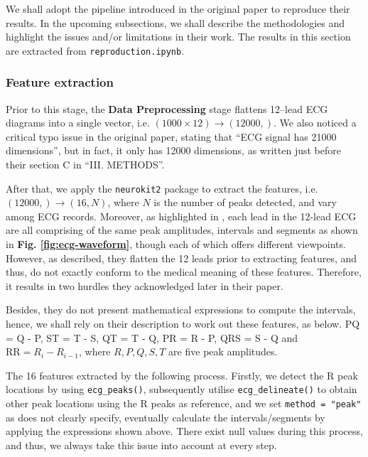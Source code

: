 \label{sec:part_1_method}

We shall adopt the pipeline introduced in the original paper to reproduce their results.
In the upcoming subsections, we shall describe the methodologies and highlight the issues and/or limitations in their work.
The results in this section are extracted from \texttt{reproduction.ipynb}.

\subsubsection{Feature extraction}

Prior to this stage, the \textbf{Data Preprocessing} stage flattens 12–lead ECG diagrams into a single vector, i.e. $(1000 \times 12) \rightarrow (12000,)$.
We also noticed a critical typo issue in the original paper, stating that ``ECG signal has 21000 dimensions'', but in fact, it only has 12000 dimensions, as written just before their section C in ``III. METHODS''.

After that, we apply the \texttt{neurokit2} package \cite{Makowski2021neurokit} to extract the features, i.e. $(12000,) \rightarrow (16, N)$, where $N$ is the number of peaks detected, and vary among ECG records.
Moreover, as highlighted in \cite{GOLDBERGER2018xi}, each lead in the 12-lead ECG are all comprising of the same peak amplitudes, intervals and segments as shown in \textbf{Fig. \ref{fig:ecg-waveform}}, though each of which offers different viewpoints.
However, as described, they flatten the 12 leads prior to extracting features, and thus, do not exactly conform to the medical meaning of these features. Therefore, it results in two hurdles they acknowledged later in their paper.

Besides, they do not present mathematical expressions to compute the intervals, hence, we shall rely on their description to work out these features, as below.
PQ = Q - P, ST = T - S, QT = T - Q, PR = R - P, QRS = S - Q and $\text{RR} = R_i - R_{i - 1}$, where $R, P, Q, S, T$ are five peak amplitudes.

The 16 features extracted by the following process. Firstly, we detect the R peak locations by using \texttt{ecg\_peaks()}, subsequently utilise \texttt{ecg\_delineate()} to obtain other peak locations using the R peaks as reference, and we set \texttt{method = "peak"} as \cite{sinha2023dasmcc} does not clearly specify,
eventually calculate the intervals/segments by applying the expressions shown above. There exist null values during this process, and thus, we always take this issue into account at every step.

